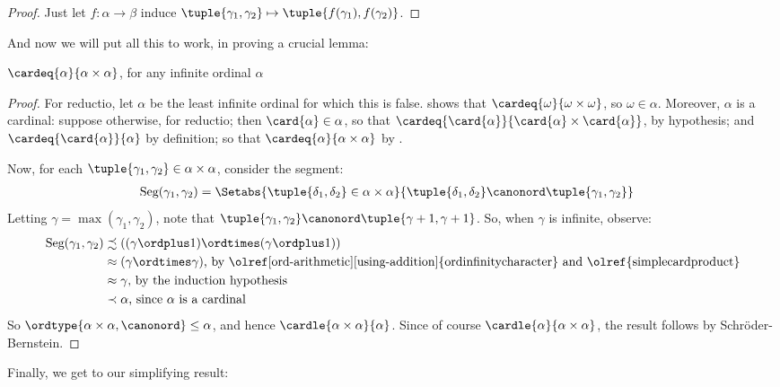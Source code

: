 \documentclass[../../../include/open-logic-section]{subfiles}
\begin{document}
\begin{proof}
Just let $f \colon \alpha \to \beta$ induce $\tuple{\gamma_1,
\gamma_2} \mapsto \tuple{f(\gamma_1), f(\gamma_2)}$.
\end{proof}
\noindent
And now we will put all this to work, in proving a crucial lemma:
\begin{lem}
$\cardeq{\alpha}{\alpha \times \alpha}$, for any infinite ordinal
$\alpha$
\end{lem}

\begin{proof}
For reductio, let $\alpha$ be the least infinite ordinal for which
this is false.  shows
that $\cardeq{\omega}{\omega\times\omega}$, so $\omega \in \alpha$.
Moreover, $\alpha$ is a cardinal: suppose otherwise, for reductio;
then $\card{\alpha} \in \alpha$, so that
$\cardeq{\card{\alpha}}{\card{\alpha} \times \card{\alpha}}$, by
hypothesis; and $\cardeq{\card{\alpha}}{\alpha}$ by definition; so
that $\cardeq{\alpha}{\alpha\times\alpha}$ by
. 

Now, for each $\tuple{\gamma_1, \gamma_2} \in \alpha \times \alpha$,
consider the segment:
\begin{align*}
	\text{Seg}(\gamma_1, \gamma_2) &= \Setabs{\tuple{\delta_1, \delta_2} \in \alpha \times \alpha}{\tuple{\delta_1, \delta_2} \canonord \tuple{\gamma_1, \gamma_2}}
\end{align*}
Letting $\gamma = \max(\gamma_1, \gamma_2)$, note that $\tuple{\gamma_1, \gamma_2} \canonord \tuple{\gamma+1, \gamma + 1}$. So, when $\gamma$ is infinite, observe:
\begin{align*}
	\text{Seg}(\gamma_1, \gamma_2) & 
	\precsim ((\gamma \ordplus 1)\ordtimes (\gamma \ordplus 1))\\
	&\approx (\gamma \ordtimes \gamma)
	\text{, by \olref[ord-arithmetic][using-addition]{ordinfinitycharacter} and 
	\olref{simplecardproduct}}\\
	&\approx \gamma \text{, by the induction hypothesis}\\
	& \prec \alpha\text{, since $\alpha$ is a cardinal}
\end{align*}
So $\ordtype{\alpha\times \alpha, \canonord} \leq \alpha$, and hence
$\cardle{\alpha \times \alpha}{\alpha}$. Since of course
$\cardle{\alpha}{\alpha \times \alpha}$, the result follows by
Schr\"oder-Bernstein. 
\end{proof}

Finally, we get to our simplifying result:
\end{document}
